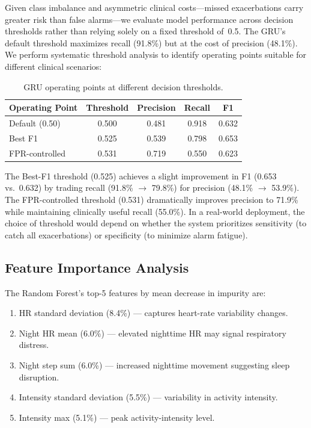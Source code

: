 \documentclass[11pt,a4paper]{article}
\begin{document}
Given class imbalance and asymmetric clinical costs—missed exacerbations
carry greater risk than false alarms—we evaluate model performance across
decision thresholds rather than relying solely on a fixed threshold of~0.5.
The GRU's default threshold maximizes recall (91.8\%) but at the cost of
precision (48.1\%).  We perform systematic threshold analysis to identify
operating points suitable for different clinical scenarios:

\begin{table}[H]
\centering
\caption{GRU operating points at different decision thresholds.}
\label{tab:thresholds}
\small
\begin{tabular}{lcccc}
\toprule
\textbf{Operating Point} & \textbf{Threshold} & \textbf{Precision} &
  \textbf{Recall} & \textbf{F1} \\
\midrule
Default (0.50)            & 0.500 & 0.481 & 0.918 & 0.632 \\
Best F1                   & 0.525 & 0.539 & 0.798 & 0.653 \\
FPR-controlled            & 0.531 & 0.719 & 0.550 & 0.623 \\
\bottomrule
\end{tabular}
\end{table}

The Best-F1 threshold (0.525) achieves a slight improvement in F1 (0.653 vs.\
0.632) by trading recall (91.8\% $\to$ 79.8\%) for precision (48.1\% $\to$
53.9\%).  The FPR-controlled threshold (0.531) dramatically improves precision
to 71.9\% while maintaining clinically useful recall (55.0\%).  In a
real-world deployment, the choice of threshold would depend on whether the
system prioritizes sensitivity (to catch all exacerbations) or specificity (to
minimize alarm fatigue).

\subsection{Feature Importance Analysis}

The Random Forest's top-5 features by mean decrease in impurity are:

\begin{enumerate}[nosep]
  \item HR standard deviation (8.4\%) — captures heart-rate variability
        changes.
  \item Night HR mean (6.0\%) — elevated nighttime HR may signal respiratory
        distress.
  \item Night step sum (6.0\%) — increased nighttime movement suggesting
        sleep disruption.
  \item Intensity standard deviation (5.5\%) — variability in activity
        intensity.
  \item Intensity max (5.1\%) — peak activity-intensity level.
\end{enumerate}
\end{document}
